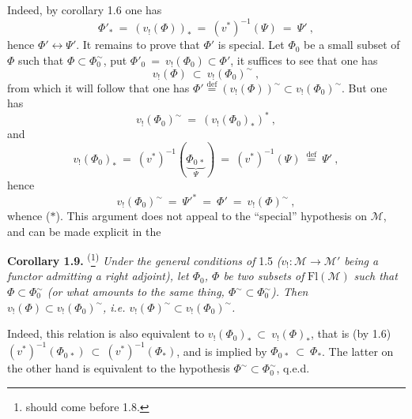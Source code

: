 \documentclass[11pt]{article}
\newcommand{\printedpage}[1]{\marginpar{\footnotesize p.~#1}}
\newcommand{\msp}[1]{\marginpar{\footnotesize [#1]}}
\newcommand{\clos}{\longleftrightarrow}
\newcommand{\fl}{\longrightarrow}
\begin{document}
Indeed, by corollary 1.6 one has
\[
\Phi'_{*} \ =\ (v_{!}(\Phi))_{*} \ =\ (v^{*})^{-1}(\Psi) \ =\ \Psi'\ ,
\]
hence $\Phi' \clos \Psi'$. It remains to prove that $\Phi'$ is special. Let $\Phi_0$ be a small subset of $\Phi$ such that $\Phi \subset \Phi_0^{\sim}$, put $\Phi'_0 \ =\ v_{!}(\Phi_0) \subset \Phi'$, \msp{page 9} it suffices to see that one has
\[
v_{!}(\Phi) \ \subset\ v_{!}(\Phi_0)^{\sim}\ , \tag*{($*$)}
\]
from which it will follow that one has $\Phi' \overset{\text{def}}{=} (v_{!}(\Phi))^{\sim} \subset v_{!}(\Phi_0)^{\sim}$. But one has
\[
v_{!}(\Phi_0)^{\sim} \ =\ (v_{!}(\Phi_0)_{*})^{*}\ ,
\]
\printedpage{6}
and
\[
v_{!}(\Phi_0)_{*} \ =\ (v^{*})^{-1}(\underbrace{\Phi_{0\,*}}_{\Psi}) \ =\ (v^{*})^{-1}(\Psi) \ \overset{\text{def}}{=}\ \Psi'\ ,
\]
hence
\[
v_{!}(\Phi_0)^{\sim} \ =\ \Psi'^{*} \ =\ \Phi' \ =\ v_{!}(\Phi)^{\sim}\ ,
\]
whence ($*$). This argument does not appeal to the ``special'' hypothesis on $\mathcal{M}$, and can be made explicit in the

\textbf{Corollary 1.9.} \textsuperscript{(}\footnote[4]{should come before 1.8.}\textsuperscript{)} \textit{Under the general conditions of} 1.5 \textit{($v_{!} : \mathcal{M} \fl \mathcal{M}'$ being a functor admitting a right adjoint), let $\Phi_0$, $\Phi$ be two subsets of} $\mathrm{Fl}(\mathcal{M})$ \textit{such that $\Phi \subset \Phi_0^{\sim}$ (or what amounts to the same thing, $\Phi^{\sim} \subset \Phi_0^{\sim}$). Then $v_{!}(\Phi) \subset v_{!}(\Phi_0)^{\sim}$, i.e. $v_{!}(\Phi)^{\sim} \subset v_{!}(\Phi_0)^{\sim}$.}

Indeed, this relation is also equivalent to $v_{!}(\Phi_0)_{*} \ \subset\ v_{!}(\Phi)_{*}$, that is (by 1.6) $(v^{*})^{-1}(\Phi_{0\,*}) \ \subset\ (v^{*})^{-1}(\Phi_{*})$, and is implied by $\Phi_{0\,*} \ \subset\ \Phi_{*}$. The latter on the other hand is equivalent to the hypothesis $\Phi^{\sim} \subset \Phi_0^{\sim}$, q.e.d.
\end{document}
